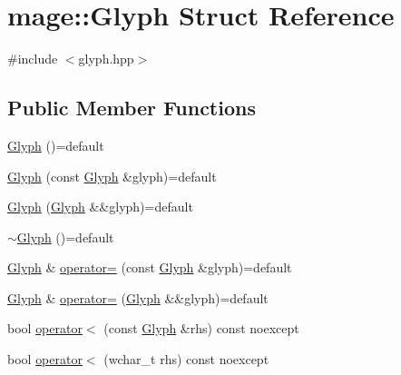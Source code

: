 \hypertarget{structmage_1_1_glyph}{}\section{mage\+:\+:Glyph Struct Reference}
\label{structmage_1_1_glyph}


{\ttfamily \#include $<$glyph.\+hpp$>$}

\subsection*{Public Member Functions}
\begin{DoxyCompactItemize}
\item 
\hyperlink{structmage_1_1_glyph_a86e6c795e2aaad853f54270c709969a6}{Glyph} ()=default
\item 
\hyperlink{structmage_1_1_glyph_a0ab4ca5253ac80f8849c7d56c0301d61}{Glyph} (const \hyperlink{structmage_1_1_glyph}{Glyph} \&glyph)=default
\item 
\hyperlink{structmage_1_1_glyph_a4b7ae94678d53ff2978635321e8f1144}{Glyph} (\hyperlink{structmage_1_1_glyph}{Glyph} \&\&glyph)=default
\item 
\hyperlink{structmage_1_1_glyph_aa8e903334e77cc2930149923461d06ab}{$\sim$\+Glyph} ()=default
\item 
\hyperlink{structmage_1_1_glyph}{Glyph} \& \hyperlink{structmage_1_1_glyph_ae9ea2dff58ce0765d7746af93d97c338}{operator=} (const \hyperlink{structmage_1_1_glyph}{Glyph} \&glyph)=default
\item 
\hyperlink{structmage_1_1_glyph}{Glyph} \& \hyperlink{structmage_1_1_glyph_a28a3279f2e142e4b771295d64d7cb414}{operator=} (\hyperlink{structmage_1_1_glyph}{Glyph} \&\&glyph)=default
\item 
bool \hyperlink{structmage_1_1_glyph_a7bb41307f74973e4bc547193dedc8dcc}{operator$<$} (const \hyperlink{structmage_1_1_glyph}{Glyph} \&rhs) const noexcept
\item 
bool \hyperlink{structmage_1_1_glyph_ad8e9835022217afef429f38891bba80e}{operator$<$} (wchar\+\_\+t rhs) const noexcept
\end{DoxyCompactItemize}
